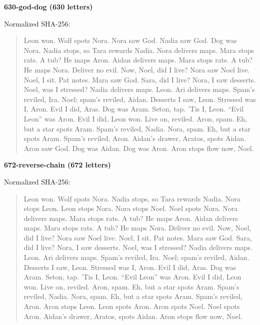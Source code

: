 \par\medskip
{}
\noindent\textbf{630-god-dog (630 letters)}\par
\noindent Normalized SHA-256: \par
\begin{quote}\small\raggedright
Leon won. Wolf spots Nora. Nora saw God. Nadia saw God. Dog was Nora. Nadia stops, so Tara rewards Nadia. Nora delivers maps. Mara stops rats. A tub? He maps Aron. Aidan delivers maps. Mara stops rats. A tub? He maps Nora. Deliver no evil. Now, Noel, did I live? Nora saw Noel live. Noel, I sit. Pat notes. Mara saw God. Sara, did I live? Nora, I saw desserts. Noel, was I stressed? Nadia delivers maps. Leon. Ari delivers maps. Spam's reviled, Ira. Noel; spam's reviled, Aidan. Desserts I saw, Leon. Stressed was I, Aron. Evil I did, Aras. Dog was Aram. Seton, tap. 'Tis I, Leon. ``Evil Leon'' was Aron. Evil I did, Leon won. Live on, reviled. Aron, spam. Eh, but a star spots Aram. Spam's reviled, Nadia. Nora, spam. Eh, but a star spots Aram. Spam's reviled, Aron. Aidan's drawer, Aratos, spots Aidan. Aron saw God. Dog was Aidan. Dog was Aron. Aron stops flow now, Noel.
\end{quote}
\par\medskip
{}
\noindent\textbf{672-reverse-chain (672 letters)}\par
\noindent Normalized SHA-256: \par
\begin{quote}\small\raggedright
Leon won. Wolf spots Nora. Nadia stops, so Tara rewards Nadia. Nora stops Leon. Leon stops Nora. Nora stops Noel. Noel spots Nora. Nora delivers maps. Mara stops rats. A tub? He maps Aron. Aidan delivers maps. Mara stops rats. A tub? He maps Nora. Deliver no evil. Now, Noel, did I live? Nora saw Noel live. Noel, I sit. Pat notes. Mara saw God. Sara, did I live? Nora, I saw desserts. Noel, was I stressed? Nadia delivers maps. Leon. Ari delivers maps. Spam's reviled, Ira. Noel; spam's reviled, Aidan. Desserts I saw, Leon. Stressed was I, Aron. Evil I did, Aras. Dog was Aram. Seton, tap. 'Tis I, Leon. ``Evil Leon'' was Aron. Evil I did, Leon won. Live on, reviled. Aron, spam. Eh, but a star spots Aram. Spam's reviled, Nadia. Nora, spam. Eh, but a star spots Aram. Spam's reviled, Aron. Aron stops Leon. Leon spots Aron. Aron spots Noel. Noel spots Aron. Aidan's drawer, Aratos, spots Aidan. Aron stops flow now, Noel.
\end{quote}
